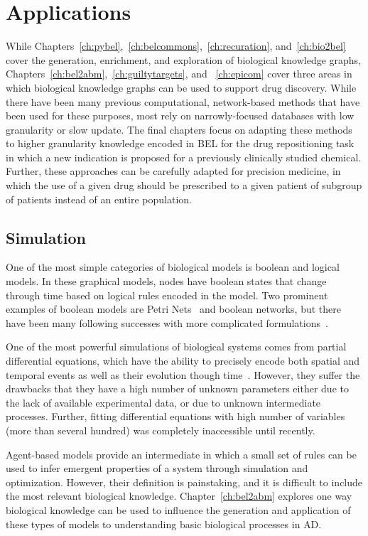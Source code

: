 \section{Applications}
\label{sec:introduction_applications}

While Chapters~\ref{ch:pybel},~\ref{ch:belcommons},~\ref{ch:recuration}, and~\ref{ch:bio2bel} cover the generation, enrichment, and exploration of biological knowledge graphs, Chapters~\ref{ch:bel2abm},~\ref{ch:guiltytargets}, and ~\ref{ch:epicom} cover three areas in which biological knowledge graphs can be used to support drug discovery.
While there have been many previous computational, network-based methods that have been used for these purposes, most rely on narrowly-focused databases with low granularity or slow update.
The final chapters focus on adapting these methods to higher granularity knowledge encoded in BEL for the drug repositioning task in which a new indication is proposed for a previously clinically studied chemical.
Further, these approaches can be carefully adapted for precision medicine, in which the use of a given drug should be prescribed to a given patient of subgroup of patients instead of an entire population.

\subsection{Simulation}

One of the most simple categories of biological models is boolean and logical models.
In these graphical models, nodes have boolean states that change through time based on logical rules encoded in the model.
Two prominent examples of boolean models are Petri Nets~\cite{Peterson1977} and boolean networks\cite{Albert2008}, but there have been many following successes with more complicated formulations~\cite{Saez-Rodriguez2011,Gyori2017,Karlebach2008}.

One of the most powerful simulations of biological systems comes from partial differential equations, which have the ability to precisely encode both spatial and temporal events as well as their evolution though time~\cite{Lopez2013}.
However, they suffer the drawbacks that they have a high number of unknown parameters either due to the lack of available experimental data, or due to unknown intermediate processes.
Further, fitting differential equations with high number of variables (more than several hundred) was completely inaccessible until recently.

Agent-based models provide an intermediate in which a small set of rules can be used to infer emergent properties of a system through simulation and optimization.
However, their definition is painstaking, and it is difficult to include the most relevant biological knowledge.
Chapter~\ref{ch:bel2abm} explores one way biological knowledge can be used to influence the generation and application of these types of models to understanding basic biological processes in \ac{AD}.

